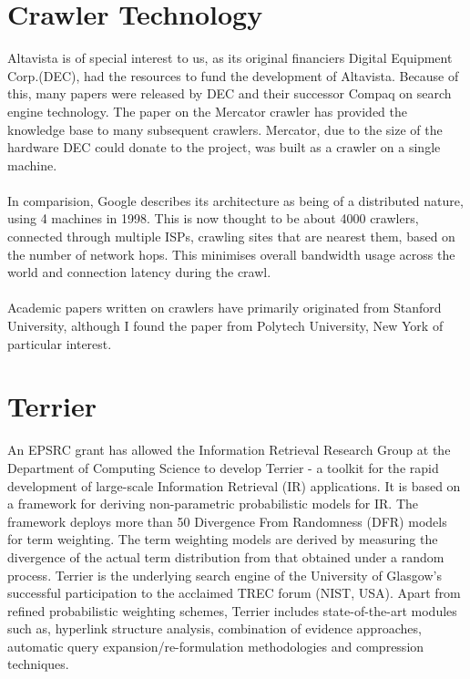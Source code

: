 \section{Crawler Technology}
Altavista is of special interest to us, as its original financiers Digital Equipment Corp.(DEC), had the resources to fund the development of Altavista. Because of this, many papers were released by DEC and their successor Compaq on search engine technology. The paper on the Mercator crawler\cite{ref2} has provided the knowledge base to many subsequent crawlers. Mercator, due to the size of the hardware DEC could donate to the project, was built as a crawler on a single machine.\\
\ \\ 
In comparision, Google describes its architecture\cite{ref7} as being of a distributed nature, using 4 machines in 1998. This is now thought to be about 4000 crawlers, connected through multiple ISPs\cite{site8}, crawling sites that are nearest them, based on the number of network hops. This minimises overall bandwidth usage across the world and connection latency during the crawl.\\
\ \\
Academic papers written on crawlers have primarily originated from Stanford University\cite{ref3,ref5,ref7}, although I found the paper from Polytech University, New York\cite{ref1} of particular interest.

\section{Terrier}\label{terrier_desc}
An EPSRC grant has allowed the Information Retrieval Research Group at the Department of Computing Science to develop Terrier - a toolkit for the rapid development of large-scale Information Retrieval (IR) applications. It is based on a framework for deriving non-parametric probabilistic models for IR. The framework deploys more than 50 Divergence From Randomness\cite{ref14} (DFR) models for term weighting. The term weighting models are derived by measuring the divergence of the actual term distribution from that obtained under a random process. Terrier is the underlying search engine of the University of Glasgow's successful participation to the acclaimed TREC forum (NIST, USA). Apart from refined probabilistic weighting schemes, Terrier includes state-of-the-art modules such as, hyperlink structure analysis, combination of evidence approaches, automatic query expansion/re-formulation\cite{xu96query} methodologies and compression techniques.

